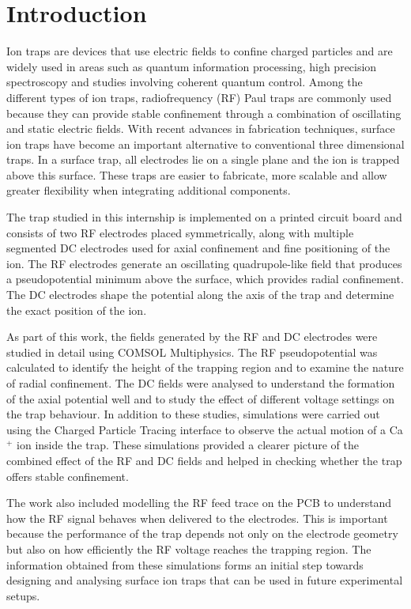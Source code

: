 \documentclass[12pt,a4paper]{report}
\begin{document}
\chapter*{Introduction}

Ion traps are devices that use electric fields to confine charged particles and are widely used in areas such as quantum information processing, high precision spectroscopy and studies involving coherent quantum control. Among the different types of ion traps, radiofrequency (RF) Paul traps are commonly used because they can provide stable confinement through a combination of oscillating and static electric fields. With recent advances in fabrication techniques, surface ion traps have become an important alternative to conventional three dimensional traps. In a surface trap, all electrodes lie on a single plane and the ion is trapped above this surface. These traps are easier to fabricate, more scalable and allow greater flexibility when integrating additional components.

The trap studied in this internship is implemented on a printed circuit board and consists of two RF electrodes placed symmetrically, along with multiple segmented DC electrodes used for axial confinement and fine positioning of the ion. The RF electrodes generate an oscillating quadrupole-like field that produces a pseudopotential minimum above the surface, which provides radial confinement. The DC electrodes shape the potential along the axis of the trap and determine the exact position of the ion.

As part of this work, the fields generated by the RF and DC electrodes were studied in detail using COMSOL Multiphysics. The RF pseudopotential was calculated to identify the height of the trapping region and to examine the nature of radial confinement. The DC fields were analysed to understand the formation of the axial potential well and to study the effect of different voltage settings on the trap behaviour. In addition to these studies, simulations were carried out using the Charged Particle Tracing interface to observe the actual motion of a Ca$^{+}$ ion inside the trap. These simulations provided a clearer picture of the combined effect of the RF and DC fields and helped in checking whether the trap offers stable confinement.

The work also included modelling the RF feed trace on the PCB to understand how the RF signal behaves when delivered to the electrodes. This is important because the performance of the trap depends not only on the electrode geometry but also on how efficiently the RF voltage reaches the trapping region. The information obtained from these simulations forms an initial step towards designing and analysing surface ion traps that can be used in future experimental setups.
\end{document}
